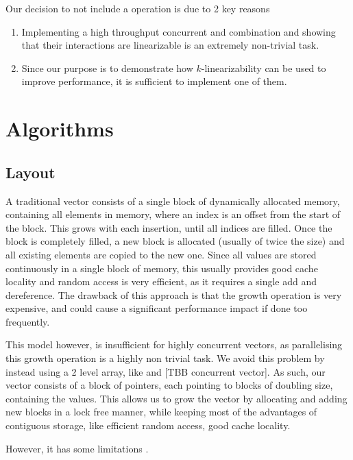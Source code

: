 \documentclass{sigplanconf}
\begin{document}
Our decision to not include a  operation is due to 2 key reasons
\begin{enumerate}
  \item Implementing a high throughput concurrent  and  combination and showing that their interactions are linearizable is an extremely non-trivial task.
  \item Since our purpose is to demonstrate how $k$-linearizability can be used to improve performance, it is sufficient to implement one of them.
\end{enumerate}


\section{Algorithms}
\label{sec:implementation}

\subsection{Layout}
A traditional vector consists of a single block of dynamically allocated memory, containing all elements in memory, where an index is an offset from the start of the block. This grows with each insertion, until all indices are filled. Once the block is completely filled, a new block is allocated (usually of twice the size) and all existing elements are copied to the new one. Since all values are stored continuously in a single block of memory, this usually provides good cache locality and random access is very efficient, as it requires a single add and dereference. The drawback of this approach is that the growth operation is very expensive, and could cause a significant performance impact if done too frequently.

This model however, is insufficient for highly concurrent vectors, as parallelising this growth operation is a highly non trivial task. We avoid this problem by instead using a 2 level array, like \citet{dechev06} and [TBB concurrent vector]. As such, our vector consists of a block of pointers, each pointing to blocks of doubling size, containing the values. This allows us to grow the vector by allocating and adding new blocks in a lock free manner, while keeping most of the advantages of contiguous storage, like efficient random access, good cache locality.

However, it has some limitations \cite{dechev06}.
\end{document}
